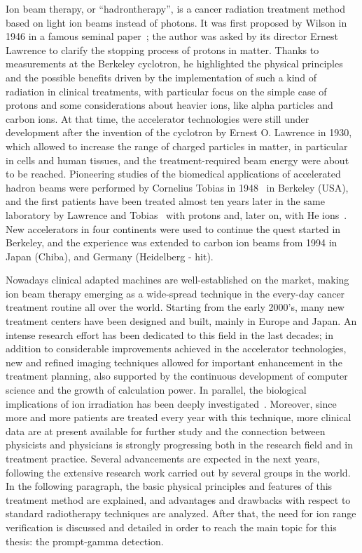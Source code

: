 Ion beam therapy, or \enquote{hadrontherapy}, is a cancer radiation treatment method based on light ion beams instead of photons. It was first proposed by Wilson in 1946 in a famous seminal paper~\parencite{Wilson1946}; the author was asked by its director Ernest Lawrence to clarify the stopping process of protons in matter. Thanks to measurements at the Berkeley cyclotron, he highlighted the physical principles and the possible benefits driven by the implementation of such a kind of radiation in clinical treatments, with particular focus on the simple case of protons and some considerations about heavier ions, like alpha particles and carbon ions.  At that time, the accelerator technologies were still under development after the invention of the cyclotron by Ernest O. Lawrence in 1930, which allowed to increase the range of charged particles in matter, in particular in cells and human tissues, and the treatment-required beam energy were about to be reached. Pioneering studies of the biomedical applications of accelerated hadron beams were performed by Cornelius Tobias in 1948~\parencite{Blakely2009} in Berkeley (USA), and the first patients have been treated almost ten years later in the same laboratory by Lawrence and Tobias~\parencite{Tobias1955, Tobias1958} with protons and, later on, with He ions~\parencite{Halperin2006}. New accelerators in four continents were used to continue the quest started in Berkeley, and the experience was extended to carbon ion beams from 1994 in Japan (Chiba), and Germany (Heidelberg - \gls{hit}). 

Nowadays clinical adapted machines are well-established on the market, making ion beam therapy emerging as a wide-spread technique in the every-day cancer treatment routine all over the world. Starting from the early 2000's, many new treatment centers have been designed and built, mainly in Europe and Japan. An intense research effort has been dedicated to this field in the last decades; in addition to considerable improvements achieved in the accelerator technologies, new and refined imaging techniques allowed for important enhancement in the treatment planning, also supported by the continuous development of computer science and the growth of calculation power. In parallel, the biological implications of ion irradiation has been deeply investigated~\parencite{Tobias1982, Brahme2004, Friedrich2012, }. Moreover, since more and more patients are treated every year with this technique, more clinical data are at present available for further study and the connection between physicists and physicians is strongly progressing both in the research field and in treatment practice. Several advancements are expected in the next years, following the extensive research work carried out by several groups in the world. In the following paragraph, the basic physical principles and features of this treatment method are explained, and advantages and drawbacks with respect to standard radiotherapy techniques are analyzed. After that, the need for ion range verification is discussed and detailed in order to reach the main topic for this thesis: the prompt-gamma detection.   

